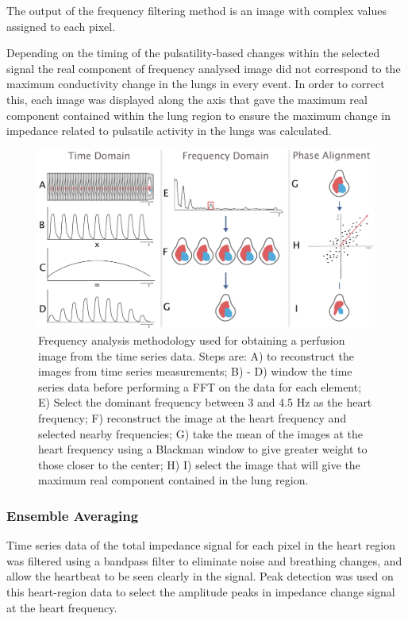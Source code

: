 The output of the frequency filtering method is an 
image with complex values assigned to each pixel.  

Depending on the timing of the pulsatility-based changes within the selected signal
the real component of frequency analysed image 
did not correspond to the maximum conductivity 
change in the lungs in every event.
In order to correct this, each image was displayed along the axis 
that gave the maximum real component contained
within the lung region to ensure
the maximum change in impedance related to pulsatile activity in the lungs was calculated.

\begin{figure}[H]
\includegraphics[width=\textwidth]{chapter3-perfusion_analysis/imgs/fig-methodsFrequency.pdf}
\caption[Frequency analysis methods]{
Frequency analysis methodology used for obtaining a perfusion image 
from the time series data. Steps are: 
A) to reconstruct the images from time series measurements; 
B) - D) window the time series data before performing a 
FFT on the data for each element; 
E) Select the dominant frequency between 3 and 4.5 Hz as the heart frequency;
F) reconstruct the image at the heart frequency and selected nearby frequencies; 
G) take the mean of the images at the heart frequency using a Blackman window 
to give greater weight to those closer to the center; 
H) I) select the image that will give the maximum real component contained
in the lung region.
}
\label{fig:freqAnalysis}
\end{figure}

\subsubsection{Ensemble Averaging}

Time series data of the total impedance signal for each pixel in the heart region was filtered 
using a bandpass filter to eliminate noise and breathing changes, 
and allow the heartbeat to be seen clearly in the signal.
Peak detection was used on this heart-region data
to select the amplitude peaks in impedance change
signal at the heart frequency.

